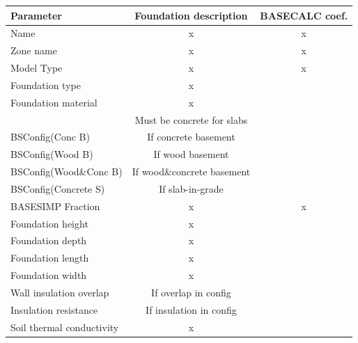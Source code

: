 \begin{longtable}{lcc}
\hline
\textbf{Parameter }             & \textbf{Foundation description}   & \textbf{BASECALC coef.}     \\
\hline
\hline
Name                            & x                                 & x                         \\
Zone name                       & x                                 & x                         \\
Model Type                      & x                                 & x                         \\
Foundation type                 & x                                 &                           \\
Foundation material             & x                                 &                           \\
                                & Must be concrete for slabs        &                           \\
BSConfig(Conc B)                & If concrete basement              &                           \\
BSConfig(Wood B)                & If wood basement                  &                           \\
BSConfig(Wood\&Conc B)          & If wood\&concrete basement     &                           \\
BSConfig(Concrete S)            & If slab-in-grade                  &                           \\
BASESIMP Fraction               & x                                 & x                         \\
Foundation height               & x                                 &                           \\
Foundation depth                & x                                 &                           \\
Foundation length               & x                                 &                           \\
Foundation width                & x                                 &                           \\
Wall insulation overlap         & If overlap in config              &                           \\
Insulation resistance           & If insulation in config           &                           \\
Soil thermal conductivity       & x                                 &                           \\

\end{longtable}
